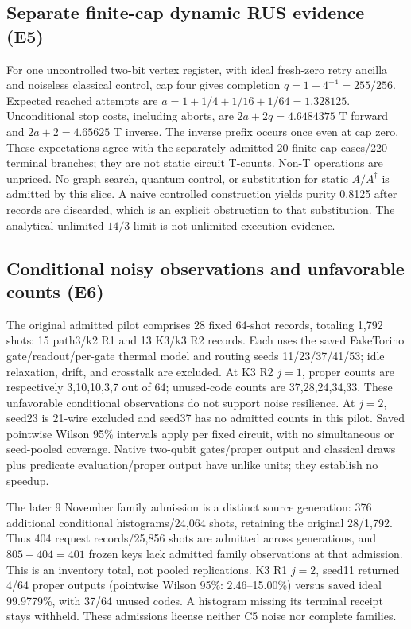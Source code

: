 \subsection{Separate finite-cap dynamic RUS evidence (E5)}
For one uncontrolled two-bit vertex register, with ideal fresh-zero retry
ancilla and noiseless classical control, cap four gives completion
$q=1-4^{-4}=255/256$. Expected reached attempts are
$a=1+1/4+1/16+1/64=1.328125$. Unconditional stop costs, including aborts,
are $2a+2q=4.6484375$ T forward and $2a+2=4.65625$ T inverse.
The inverse prefix occurs once even at cap zero. These expectations agree with
the separately admitted 20 finite-cap cases/220 terminal branches; they are
not static circuit T-counts. Non-T operations are unpriced. No graph search,
quantum control, or substitution for static $A/A^\dagger$ is admitted by this
slice. A naive controlled construction yields purity 0.8125 after records are
discarded, which is an explicit obstruction to that substitution. The analytical
unlimited $14/3$ limit is not unlimited execution evidence.

\subsection{Conditional noisy observations and unfavorable counts (E6)}
The original admitted pilot comprises 28 fixed 64-shot records, totaling
1,792 shots: 15 path3/k2 R1 and 13 K3/k3 R2 records. Each uses the saved
FakeTorino gate/readout/per-gate thermal model and routing seeds
11/23/37/41/53; idle relaxation, drift, and crosstalk are excluded.
At K3 R2 $j=1$, proper counts are respectively 3,10,10,3,7 out of 64;
unused-code counts are 37,28,24,34,33. These unfavorable conditional observations
do not support noise resilience. At $j=2$, seed23 is 21-wire excluded and
seed37 has no admitted counts in this pilot. Saved pointwise Wilson 95\%
intervals apply per fixed circuit, with no simultaneous or seed-pooled coverage.
Native two-qubit gates/proper output and classical draws plus predicate
evaluation/proper output have unlike units; they establish no speedup.

The later 9 November family admission is a distinct source generation:
376 additional conditional histograms/24,064 shots, retaining the original
28/1,792. Thus 404 request records/25,856 shots are admitted across generations,
and $805-404=401$ frozen keys lack admitted family observations at that admission.
This is an inventory total, not pooled replications. K3 R1 $j=2$, seed11 returned
4/64 proper outputs (pointwise Wilson 95\%: 2.46--15.00\%) versus saved ideal
99.9779\%, with 37/64 unused codes. A histogram missing its terminal receipt
stays withheld. These admissions license neither C5 noise nor complete families.

